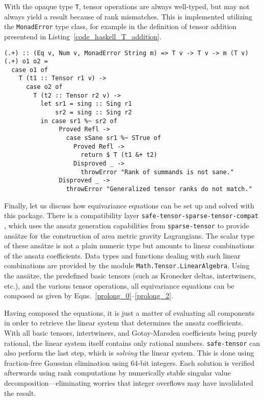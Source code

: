 With the opaque type \texttt{T}, tensor operations are always well-typed, but may not always yield a result because of rank mismatches. This is implemented utilizing the \texttt{MonadError} type class, for example in the definition of tensor addition presentend in Listing~\ref{code_haskell_T_addition}.

\begin{code}
  \begin{verbatim}
(.+) :: (Eq v, Num v, MonadError String m) => T v -> T v -> m (T v)
(.+) o1 o2 =
  case o1 of
    T (t1 :: Tensor r1 v) ->
      case o2 of
        T (t2 :: Tensor r2 v) ->
          let sr1 = sing :: Sing r1
              sr2 = sing :: Sing r2
          in case sr1 %~ sr2 of
               Proved Refl ->
                 case sSane sr1 %~ STrue of
                   Proved Refl ->
                     return $ T (t1 &+ t2)
                   Disproved _ ->
                     throwError "Rank of summands is not sane."
               Disproved _ ->
                 throwError "Generalized tensor ranks do not match."
  \end{verbatim}
  \label{code_haskell_T_addition}
\end{code}

Finally, let us discuss how equivariance equations can be set up and solved with this package. There is a compatibility layer \texttt{safe-tensor-sparse-tensor-compat} \cite{Alex_2020_safe-tensor}, which uses the ansatz generation capabilities from \texttt{sparse-tensor} to provide ansätze for the construction of area metric gravity Lagrangians. The scalar type of these ansätze is not a plain numeric type but amounts to linear combinations of the ansatz coefficients. Data types and functions dealing with such linear combinations are provided by the module \texttt{Math.Tensor.LinearAlgebra}. Using the ansätze, the predefined basic tensors (such as Kronecker deltas, intertwiners, etc.), and the various tensor operations, all equivariance equations can be composed as given by Eqns.\ \eqref{prolong_0}--\eqref{prolong_2}.

Having composed the equations, it is just a matter of evaluating all components in order to retrieve the linear system that determines the ansatz coefficients. With all basic tensors, intertwiners, and Gotay-Marsden coefficients being purely rational, the linear system itself contains only rational numbers. \texttt{safe-tensor} can also perform the last step, which is \emph{solving} the linear system. This is done using fraction-free Gaussian elimination using 64-bit integers. Each solution is verified afterwards using rank computations by numerically stable singular value decomposition---eliminating worries that integer overflows may have invalidated the result.


